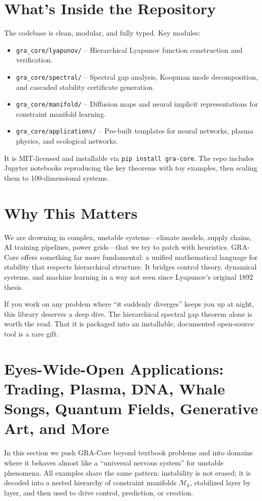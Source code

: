 \documentclass[11pt,a4paper]{article}
\begin{document}
\section{What's Inside the Repository}
The codebase is clean, modular, and fully typed. Key modules:
\begin{itemize}[noitemsep]
    \item \texttt{gra\_core/lyapunov/} -- Hierarchical Lyapunov function construction and verification.
    \item \texttt{gra\_core/spectral/} -- Spectral gap analysis, Koopman mode decomposition, and cascaded stability certificate generation.
    \item \texttt{gra\_core/manifold/} -- Diffusion maps and neural implicit representations for constraint manifold learning.
    \item \texttt{gra\_core/applications/} -- Pre-built templates for neural networks, plasma physics, and ecological networks.
\end{itemize}
It is MIT-licensed and installable via \texttt{pip install gra-core}. The repo includes Jupyter notebooks reproducing the key theorems with toy examples, then scaling them to 100-dimensional systems.

\section{Why This Matters}
We are drowning in complex, unstable systems---climate models, supply chains, AI training pipelines, power grids---that we try to patch with heuristics. GRA-Core offers something far more fundamental: a unified mathematical language for stability that respects hierarchical structure. It bridges control theory, dynamical systems, and machine learning in a way not seen since Lyapunov's original 1892 thesis.

If you work on any problem where ``it suddenly diverges'' keeps you up at night, this library deserves a deep dive. The hierarchical spectral gap theorem alone is worth the read. That it is packaged into an installable, documented open-source tool is a rare gift.

\section{Eyes-Wide-Open Applications: Trading, Plasma, DNA, Whale Songs, Quantum Fields, Generative Art, and More}
In this section we push GRA-Core beyond textbook problems and into domains where it behaves almost like a ``universal nervous system'' for unstable phenomena. All examples share the same pattern: instability is not erased; it is decoded into a nested hierarchy of constraint manifolds $\mathcal{M}_k$, stabilized layer by layer, and then used to drive control, prediction, or creation.
\end{document}

